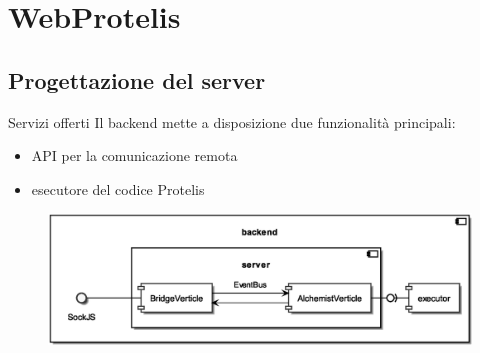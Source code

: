 \section{WebProtelis}


  \subsection{Progettazione del server}

    \begin{frame}{\insertsectionhead}{\insertsubsectionhead}

          \begin{block}{Servizi offerti}
            Il backend mette a disposizione due funzionalità principali:
            \begin{itemize}
              \item API per la comunicazione remota
              \item esecutore del codice Protelis
            \end{itemize}
          \end{block}
          \begin{figure}
            \includegraphics[width=.67\textwidth]{res/uml/architecture-design-server.eps}
          \end{figure}
    \end{frame}

